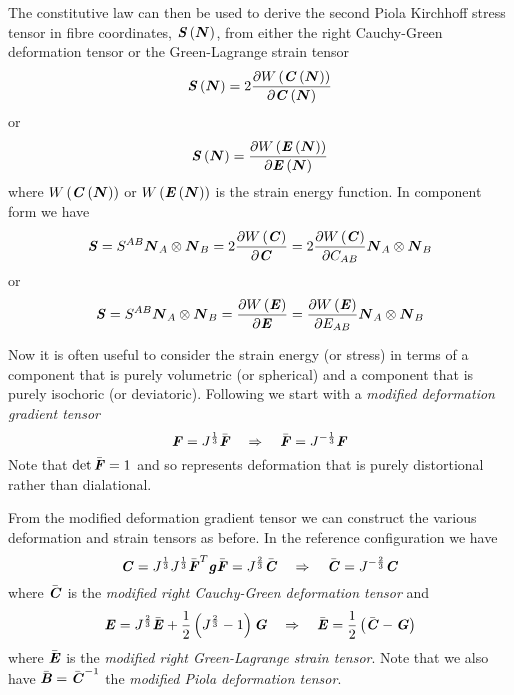 The constitutive law can then be used to derive the second Piola Kirchhoff
stress tensor in fibre coordinates, $ \boldsymbol{\mathit{S}}\left( \boldsymbol{N} \right) $, from
either the right Cauchy-Green deformation tensor or the Green-Lagrange strain
tensor \ie
\begin{equation}
   \boldsymbol{\mathit{S}}\left( \boldsymbol{N} \right) =2 \dfrac{\partial  W\left(  \boldsymbol{\mathit{C}}\left( \boldsymbol{N} \right)  \right) }{\partial  \boldsymbol{\mathit{C}}\left( \boldsymbol{N} \right) } 
\end{equation}
or
\begin{equation}
   \boldsymbol{\mathit{S}}\left( \boldsymbol{N} \right) = \dfrac{\partial  W\left(  \boldsymbol{\mathit{E}}\left( \boldsymbol{N} \right)  \right) }{\partial  \boldsymbol{\mathit{E}}\left( \boldsymbol{N} \right) } 
\end{equation}
where $ W\left(  \boldsymbol{\mathit{C}}\left( \boldsymbol{N} \right)  \right) $ or
$ W\left(  \boldsymbol{\mathit{E}}\left( \boldsymbol{N} \right)  \right) $ is the strain energy
function. In component form we have
\begin{equation}
  \boldsymbol{\mathit{S}}=S^{AB} \boldsymbol{N}_{A} \otimes \boldsymbol{N}_{B} =2 \dfrac{\partial  W\left( \boldsymbol{\mathit{C}} \right) }{\partial \boldsymbol{\mathit{C}}} =2 \dfrac{\partial  W\left( \boldsymbol{\mathit{C}} \right) }{\partial C_{AB}}  \boldsymbol{N}_{A} \otimes \boldsymbol{N}_{B} 
\end{equation}
or
\begin{equation}
  \boldsymbol{\mathit{S}}=S^{AB} \boldsymbol{N}_{A} \otimes \boldsymbol{N}_{B} = \dfrac{\partial  W\left( \boldsymbol{\mathit{E}} \right) }{\partial \boldsymbol{\mathit{E}}} = \dfrac{\partial  W\left( \boldsymbol{\mathit{E}} \right) }{\partial E_{AB}}  \boldsymbol{N}_{A} \otimes \boldsymbol{N}_{B} 
\end{equation}



Now it is often useful to consider the strain energy (or stress) in terms of a
component that is purely volumetric (or spherical) and a component that is
purely isochoric (or deviatoric). Following  we start with
a \emph{modified deformation gradient tensor} \ie
\begin{equation}
  \tensor{F}=J^{\frac{1}{3}}\bar{\tensor{F}} \quad\Rightarrow\quad \bar{\tensor{F}} =J^{-\frac{1}{3}}\tensor{F}
  \label{eqn:modifiedDeformationGradientTensor}
\end{equation}
Note that $\det\bar{\boldsymbol{\mathit{F}}}=1$ and so represents deformation that is
purely distortional rather than dialational. 

From the modified deformation gradient tensor we can construct the various
deformation and strain tensors as before. In the reference configuration we
have
\begin{equation}
  \boldsymbol{\mathit{C}} = J^{\frac{1}{3}}J^{\frac{1}{3}}{\bar{\boldsymbol{\mathit{F}}}}^{T}\boldsymbol{\mathit{g}}\bar{\boldsymbol{\mathit{F}}}=J^{\frac{2}{3}}\bar{\boldsymbol{\mathit{C}}} \quad\Rightarrow\quad \bar{\boldsymbol{\mathit{C}}} =J^{-\frac{2}{3}}\boldsymbol{\mathit{C}}
\end{equation}
where $\bar{\boldsymbol{\mathit{C}}}$ is the \emph{modified right Cauchy-Green deformation tensor} and
\begin{equation}
  \boldsymbol{\mathit{E}} =
  J^{\frac{2}{3}}{\bar{\boldsymbol{\mathit{E}}}}+\dfrac{1}{2}\left( J^{\frac{2}{3}}-1 \right)\boldsymbol{\mathit{G}}
  \quad\Rightarrow\quad \bar{\boldsymbol{\mathit{E}}} = \dfrac{1}{2}\left( \bar{\boldsymbol{\mathit{C}}}-\boldsymbol{\mathit{G}} \right)
\end{equation}
where $\bar{\boldsymbol{\mathit{E}}}$ is the \emph{modified right Green-Lagrange strain
  tensor}. Note that we also have
$\bar{\boldsymbol{\mathit{B}}}={\bar{\boldsymbol{\mathit{C}}}}^{-1}$ the \emph{modified Piola
  deformation tensor}.


